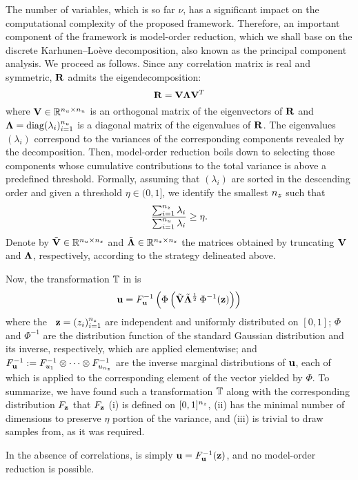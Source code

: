 The number of variables, which is so far $\nu$, has a significant impact on the
computational complexity of the proposed framework. Therefore, an important
component of the framework is model-order reduction, which we shall base on the
discrete Karhunen--Lo\`{e}ve decomposition, also known as the principal
component analysis. We proceed as follows. Since any correlation matrix is real
and symmetric, $\mathbf{R}$ admits the eigendecomposition:
\[
  \mathbf{R} = \mathbf{V} \mathbf{\Lambda} \mathbf{V}^T
\]
where $\mathbf{V} \in \mathbb{R}^{{n_u} \times {n_u}}$ is an orthogonal matrix of the
eigenvectors of $\mathbf{R}$ and $\mathbf{\Lambda} = \text{diag}(\lambda_i)_{i = 1}^{n_u}$
is a diagonal matrix of the eigenvalues of $\mathbf{R}$. The eigenvalues
$(\lambda_i)$ correspond to the variances of the corresponding components
revealed by the decomposition. Then, model-order reduction boils down to
selecting those components whose cumulative contributions to the total variance
is above a predefined threshold. Formally, assuming that $(\lambda_i)$ are
sorted in the descending order and given a threshold $\eta \in (0, 1]$, we
identify the smallest ${n_z}$ such that
\[
  \frac{\sum_{i = 1}^{n_z} \lambda_i}{\sum_{i = 1}^{n_u} \lambda_i} \geq \eta.
\]
Denote by $\tilde{\mathbf{V}} \in \mathbb{R}^{{n_u} \times {n_z}}$ and $\tilde{\mathbf{\Lambda}}
\in\mathbb{R}^{{n_z} \times {n_z}}$ the matrices obtained by truncating $\mathbf{V}$ and
$\mathbf{\Lambda}$, respectively, according to the strategy delineated above.

Now, the transformation $\mathbb{T}$ in  is
\begin{equation} \elab{transformation}
  \vu = \distribution_\vu^{-1} \left( \Phi\left( \tilde{\m{V}} \tilde{\m{\Lambda}}^\frac{1}{2} \, \Phi^{-1}(\vz) \right) \right)
\end{equation}
where the \rvs\ $\mathbf{z} = (z_i)_{i = 1}^{n_z}$ are independent and uniformly
distributed on $[0, 1]$; $\Phi$ and $\Phi^{-1}$ are the distribution function of
the standard Gaussian distribution and its inverse, respectively, which are
applied elementwise; and $F_{\mathbf{u}}^{-1} := F_{u_1}^{-1}
\otimes \cdots \otimes F_{u_{n_z}}^{-1}$ are the inverse marginal
distributions of $\mathbf{u}$, each of which is applied to the corresponding element of
the vector yielded by $\Phi$. To summarize, we have found such a transformation
$\mathbb{T}$ along with the corresponding distribution $F_{\mathbf{z}}$
that $F_{\mathbf{z}}$ (i) is defined on $[0, 1]^{n_z}$, (ii) has the minimal
number of dimensions to preserve $\eta$ portion of the variance, and (iii) is
trivial to draw samples from, as it was required.

\begin{remark}
  In the absence of correlations,  is simply $\mathbf{u} =
  F_{\mathbf{u}}^{-1}(\mathbf{z})$, and no model-order reduction is possible.
\end{remark}
